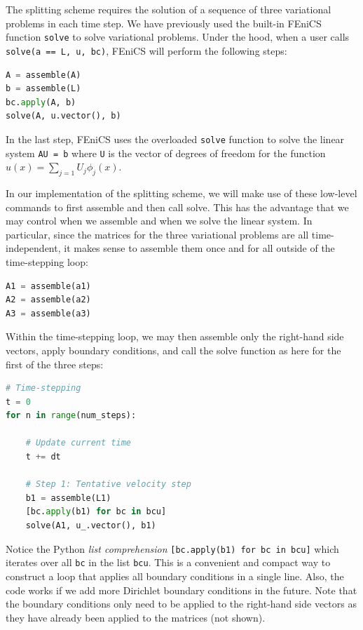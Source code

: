 \documentclass[graybox,envcountchap,sectrefs,final]{svmonodo}
\begin{document}
The splitting scheme requires the solution of a sequence of three
variational problems in each time step. We have previously used the
built-in FEniCS function \texttt{solve} to solve variational problems. Under
the hood, when a user calls \texttt{solve(a == L, u, bc)}, FEniCS will
perform the following steps:

\begin{lstlisting}[language=Python,style=graycolor]
A = assemble(A)
b = assemble(L)
bc.apply(A, b)
solve(A, u.vector(), b)
\end{lstlisting}
In the last step, FEniCS uses the overloaded \texttt{solve} function to solve
the linear system \texttt{AU = b} where \texttt{U} is the vector of degrees of
freedom for the function $u(x) = \sum_{j=1} U_j \phi_j(x)$.


In our implementation of the splitting scheme, we will make use of
these low-level commands to first assemble and then call solve. This
has the advantage that we may control when we assemble and when we
solve the linear system. In particular, since the matrices for the
three variational problems are all time-independent, it makes sense to
assemble them once and for all outside of the time-stepping loop:


\begin{lstlisting}[language=Python,style=graycolor]
A1 = assemble(a1)
A2 = assemble(a2)
A3 = assemble(a3)
\end{lstlisting}
Within the time-stepping loop, we may then assemble only the
right-hand side vectors, apply boundary conditions, and call the solve
function as here for the first of the three steps:

\begin{lstlisting}[language=Python,style=graycolor]
# Time-stepping
t = 0
for n in range(num_steps):

    # Update current time
    t += dt

    # Step 1: Tentative velocity step
    b1 = assemble(L1)
    [bc.apply(b1) for bc in bcu]
    solve(A1, u_.vector(), b1)
\end{lstlisting}
Notice the Python \emph{list comprehension} \texttt{[bc.apply(b1) for bc in bcu]}
which iterates over all \texttt{bc} in the list \texttt{bcu}. This is a convenient
and compact way to construct a loop that applies
all boundary conditions in a single line. Also, the code works if
we add more Dirichlet boundary conditions in the future. Note that
the boundary conditions only need to be applied to the right-hand side
vectors as they have already been applied to the matrices (not shown).
\end{document}
